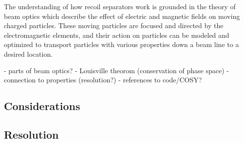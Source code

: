 The understanding of how recoil separators work is grounded in the theory of
beam optics which describe the effect of electric and magnetic fields on moving
charged particles. These moving particles are focused and directed by the
electromagnetic elements, and their action on particles can be modeled and
optimized to transport particles with various properties down a beam line to a
desired location.

- parts of beam optics?
- Louisville theorom (conservation of phase space)
- connection to properties (resolution?)
- references to code/COSY?

\subsection{Considerations}
\subsection{Resolution}
